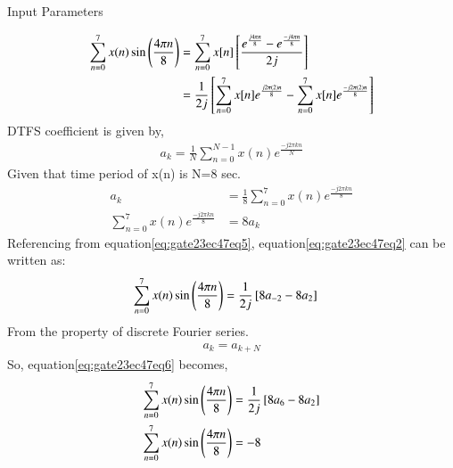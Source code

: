 \documentclass[journal,12pt,onecolumn]{IEEEtran}
\theoremstyle{remark}
\begin{document}
\begin{table}[h]
 	\centering
 	\resizebox{6 cm}{!}{
 		
 	}
 	\vspace{6 pt}
 	\caption{Input Parameters}
 	\label{eq:gate23ec47tab1}
 \end{table} 
\begin{align}
\sum\limits_{n=0}^{7}x(n) \sin\left(\frac{4\pi n}{8}\right)&=\sum\limits_{n=0}^{7}x[n]{}\left[\frac{e^{\frac{j4\pi n}{8}}-e^{\frac{-j4\pi n}{8}}}{2j}\right]\label{eq:gate23ec47eq1}\\
&=\frac{1}{2j}{}\left[\sum\limits_{n=0}^{7}x[n]e^{\frac{j2\pi (2)n}{8}}-\sum\limits_{n=0}^{7}x[n]e^{\frac{-j2\pi (2)n}{8}}\right]\label{eq:gate23ec47eq2}
\end{align}
DTFS coefficient is given by,\\
\begin{align}
a_k=\frac{1}{N}\sum\limits_{n=0}^{N-1} x(n)e^{\frac{-j2\pi kn}{N}}\label{eq:gate23ec47eq3}
\end{align}
Given that time period of x(n) is N=8 sec.\\
\begin{align}
a_k&=\frac{1}{8}\sum\limits_{n=0}^{7} x(n)e^{\frac{-j2\pi kn}{8}}\label{eq:gate23ec47eq4}\\
\sum\limits_{n=0}^{7} x(n)e^{\frac{-j2\pi kn}{8}}&=8a_k\label{eq:gate23ec47eq5}
\end{align}
Referencing from equation\eqref{eq:gate23ec47eq5}, equation\eqref{eq:gate23ec47eq2} can be written as:
\begin{align}
\sum\limits_{n=0}^{7}x(n) \sin\left(\frac{4\pi n}{8}\right)&=\frac{1}{2j}{}\left[8a_{-2}-8a_2\right]\label{eq:gate23ec47eq6}
\end{align}
From the property of discrete Fourier series.\\
\begin{align}
a_k=a_{k+N}\label{eq:gate23ec47eq7}
\end{align}
So, equation\eqref{eq:gate23ec47eq6} becomes,\\
\begin{align}
\sum\limits_{n=0}^{7}x(n) \sin\left(\frac{4\pi n}{8}\right)&=\frac{1}{2j}{}\left[8a_6-8a_2\right]\label{eq:gate23ec47eq8}\\
\sum\limits_{n=0}^{7}x(n) \sin\left(\frac{4\pi n}{8}\right)&=-8\label{eq:gate23ec47eq9}
\end{align}
\end{document}

